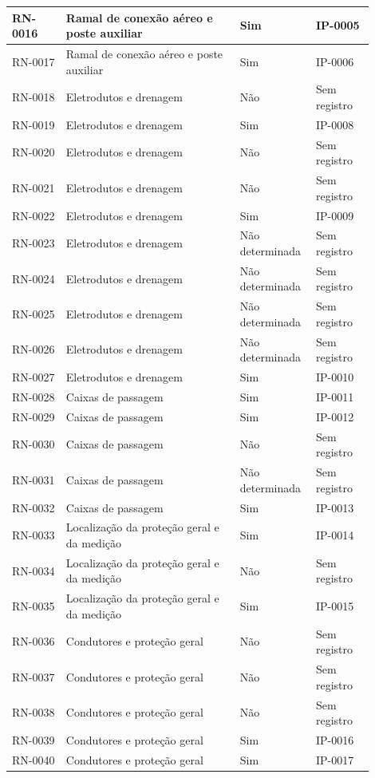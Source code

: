 \begin{longtable}{|p{0.14\linewidth}|p{0.45\linewidth}|p{0.16\linewidth}|p{0.15\linewidth}|}
RN-0016 & Ramal de conexão aéreo e poste auxiliar & Sim & IP-0005 \\\hline
RN-0017 & Ramal de conexão aéreo e poste auxiliar & Sim & IP-0006 \\\hline
RN-0018 & Eletrodutos e drenagem & Não & Sem registro \\\hline
RN-0019 & Eletrodutos e drenagem & Sim & IP-0008 \\\hline
RN-0020 & Eletrodutos e drenagem & Não & Sem registro \\\hline
RN-0021 & Eletrodutos e drenagem & Não & Sem registro \\\hline
RN-0022 & Eletrodutos e drenagem & Sim & IP-0009 \\\hline
RN-0023 & Eletrodutos e drenagem & Não determinada & Sem registro \\\hline
RN-0024 & Eletrodutos e drenagem & Não determinada & Sem registro \\\hline
RN-0025 & Eletrodutos e drenagem & Não determinada & Sem registro \\\hline
RN-0026 & Eletrodutos e drenagem & Não determinada & Sem registro \\\hline
RN-0027 & Eletrodutos e drenagem & Sim & IP-0010 \\\hline
RN-0028 & Caixas de passagem & Sim & IP-0011 \\\hline
RN-0029 & Caixas de passagem & Sim & IP-0012 \\\hline
RN-0030 & Caixas de passagem & Não & Sem registro \\\hline
RN-0031 & Caixas de passagem & Não determinada & Sem registro \\\hline
RN-0032 & Caixas de passagem & Sim & IP-0013 \\\hline
RN-0033 & Localização da proteção geral e da medição & Sim & IP-0014 \\\hline
RN-0034 & Localização da proteção geral e da medição & Não & Sem registro \\\hline
RN-0035 & Localização da proteção geral e da medição & Sim & IP-0015 \\\hline
RN-0036 & Condutores e proteção geral & Não & Sem registro \\\hline
RN-0037 & Condutores e proteção geral & Não & Sem registro \\\hline
RN-0038 & Condutores e proteção geral & Não & Sem registro \\\hline
RN-0039 & Condutores e proteção geral & Sim & IP-0016 \\\hline
RN-0040 & Condutores e proteção geral & Sim & IP-0017 \\\hline

\end{longtable}
